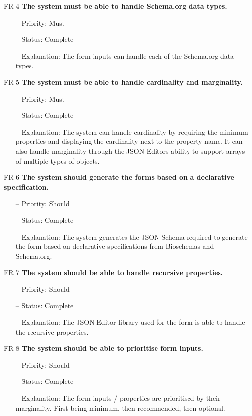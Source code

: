 \newpage
\noindent
FR 4 \textbf{The system must be able to handle Schema.org data types.}
\begin{itemize}
\item[--] Priority: Must
\item[--] Status: Complete
\item[--] Explanation: The form inputs can handle each of the Schema.org data types.
\end{itemize}
\noindent
FR 5 \textbf{The system must be able to handle cardinality and marginality.}
\begin{itemize}
\item[--] Priority: Must
\item[--] Status: Complete
\item[--] Explanation: The system can handle cardinality by requiring the minimum properties and displaying the cardinality next to the property name. It can also handle marginality through the JSON-Editors ability to support arrays of multiple types of objects.
\end{itemize}
\noindent
FR 6 \textbf{The system should generate the forms based on a declarative specification.}
\begin{itemize}
\item[--] Priority: Should
\item[--] Status: Complete
\item[--] Explanation: The system generates the JSON-Schema required to generate the form based on declarative specifications from Bioschemas and Schema.org. 
\end{itemize}
\noindent
FR 7 \textbf{The system should be able to handle recursive properties.}
\begin{itemize}
\item[--] Priority: Should
\item[--] Status: Complete
\item[--] Explanation: The JSON-Editor library used for the form is able to handle the recursive properties.
\end{itemize}

\newpage
\noindent
FR 8 \textbf{The system should be able to prioritise form inputs.}
\begin{itemize}
\item[--] Priority: Should
\item[--] Status: Complete
\item[--] Explanation: The form inputs / properties are prioritised by their marginality. First being minimum, then recommended, then optional. 
\end{itemize}

